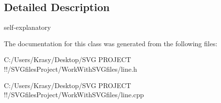 \subsection{Detailed Description}
self-\/explanatory 

The documentation for this class was generated from the following files\+:\begin{DoxyCompactItemize}
\item 
C\+:/\+Users/\+Krasy/\+Desktop/\+S\+V\+G P\+R\+O\+J\+E\+C\+T !!/\+S\+V\+Gfiles\+Project/\+Work\+With\+S\+V\+Gfiles/line.\+h\item 
C\+:/\+Users/\+Krasy/\+Desktop/\+S\+V\+G P\+R\+O\+J\+E\+C\+T !!/\+S\+V\+Gfiles\+Project/\+Work\+With\+S\+V\+Gfiles/line.\+cpp\end{DoxyCompactItemize}

